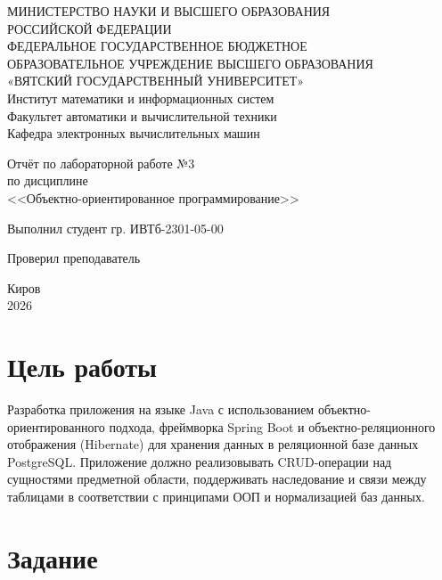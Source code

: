 \documentclass[oneside,a4paper,14pt]{extarticle}
\begin{document}
\newpage\thispagestyle{empty}
\begin{center}
	МИНИСТЕРСТВО НАУКИ И ВЫСШЕГО ОБРАЗОВАНИЯ\\
	РОССИЙСКОЙ ФЕДЕРАЦИИ\\
	ФЕДЕРАЛЬНОЕ ГОСУДАРСТВЕННОЕ БЮДЖЕТНОЕ\\
	ОБРАЗОВАТЕЛЬНОЕ УЧРЕЖДЕНИЕ ВЫСШЕГО ОБРАЗОВАНИЯ\\
	«ВЯТСКИЙ ГОСУДАРСТВЕННЫЙ УНИВЕРСИТЕТ»\\
	Институт математики и информационных систем\\
	Факультет автоматики и вычислительной техники\\
	Кафедра электронных вычислительных машин
\end{center}

\vspace{20mm}
\begin{center}

	Отчёт по лабораторной работе №3\\
	по дисциплине\\
	<<Объектно-ориентированное программирование>>\\
\end{center}
\vfill

Выполнил студент гр. ИВТб-2301-05-00 \hfill
{}

Проверил преподаватель\hfill
{}

\vfill
\begin{center}
	Киров\\
	2026
\end{center}

\newpage
\setcounter{page}{1}
\tableofcontents
\newpage

\section*{Цель работы}
Разработка приложения на языке Java с использованием объектно-ориентированного подхода, фреймворка Spring Boot и объектно-реляционного отображения (Hibernate) для хранения данных в реляционной базе данных PostgreSQL. Приложение должно реализовывать CRUD-операции над сущностями предметной области, поддерживать наследование и связи между таблицами в соответствии с принципами ООП и нормализацией баз данных.

\newpage

\section*{Задание}
\end{document}
